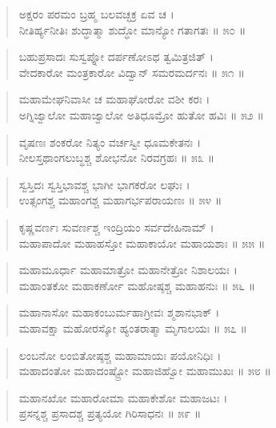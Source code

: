 \begin{verse}
ಅಕ್ಷರಂ ಪರಮಂ ಬ್ರಹ್ಮ ಬಲವಚ್ಛಕ್ರ ಏವ ಚ ।\\ನೀತಿರ್ಹ್ಯನೀತಿಃ ಶುದ್ಧಾತ್ಮಾ ಶುದ್ಧೋ ಮಾನ್ಯೋ ಗತಾಗತಃ \num{॥ ೫೦ ॥}
\end{verse}

\begin{verse}
ಬಹುಪ್ರಸಾದಃ ಸುಸ್ವಪ್ನೋ ದರ್ಪಣೋಽಥ ತ್ವಮಿತ್ರಜಿತ್ ।\\ವೇದಕಾರೋ ಮಂತ್ರಕಾರೋ ವಿದ್ವಾನ್ ಸಮರಮರ್ದನಃ \num{॥ ೫೧ ॥}
\end{verse}

\begin{verse}
ಮಹಾಮೇಘನಿವಾಸೀ ಚ ಮಹಾಘೋರೋ ವಶೀ ಕರಃ ।\\ಅಗ್ನಿಜ್ವಾಲೋ ಮಹಾಜ್ವಾಲೋ ಅತಿಧೂಮ್ರೋ ಹುತೋ ಹವಿಃ \num{॥ ೫೨ ॥}
\end{verse}

\begin{verse}
ವೃಷಣಃ ಶಂಕರೋ ನಿತ್ಯಂ ವರ್ಚಸ್ವೀ ಧೂಮಕೇತನಃ ।\\ನೀಲಸ್ತಥಾಂಗಲುಬ್ಧಶ್ಚ ಶೋಭನೋ ನಿರವಗ್ರಹಃ \num{॥ ೫೩ ॥}
\end{verse}

\begin{verse}
ಸ್ವಸ್ತಿದಃ ಸ್ವಸ್ತಿಭಾವಶ್ಚ ಭಾಗೀ ಭಾಗಕರೋ ಲಘುಃ ।\\ಉತ್ಸಂಗಶ್ಚ ಮಹಾಂಗಶ್ಚ ಮಹಾಗರ್ಭಪರಾಯಣಃ \num{॥ ೫೪ ॥}
\end{verse}

\begin{verse}
ಕೃಷ್ಣವರ್ಣಃ ಸುವರ್ಣಶ್ಚ ಇಂದ್ರಿಯಂ ಸರ್ವದೇಹಿನಾಮ್ ।\\ಮಹಾಪಾದೋ ಮಹಾಹಸ್ತೋ ಮಹಾಕಾಯೋ ಮಹಾಯಶಾಃ \num{॥ ೫೫ ॥}
\end{verse}

\begin{verse}
ಮಹಾಮೂರ್ಧಾ ಮಹಾಮಾತ್ರೋ ಮಹಾನೇತ್ರೋ ನಿಶಾಲಯಃ ।\\ಮಹಾಂತಕೋ ಮಹಾಕರ್ಣೋ ಮಹೋಷ್ಠಶ್ಚ ಮಹಾಹನುಃ \num{॥ ೫೬ ॥}
\end{verse}

\begin{verse}
ಮಹಾನಾಸೋ ಮಹಾಕಂಬುರ್ಮಹಾಗ್ರೀವಃ ಶ್ಮಶಾನಭಾಕ್ ।\\ಮಹಾವಕ್ಷಾ ಮಹೋರಸ್ಕೋ ಹ್ಯಂತರಾತ್ಮಾ ಮೃಗಾಲಯಃ \num{॥ ೫೭ ॥}
\end{verse}

\begin{verse}
ಲಂಬನೋ ಲಂಬಿತೋಷ್ಠಶ್ಚ ಮಹಾಮಾಯಃ ಪಯೋನಿಧಿಃ ।\\ಮಹಾದಂತೋ ಮಹಾದಂಷ್ಟ್ರೋ ಮಹಾಜಿಹ್ವೋ ಮಹಾಮುಖಃ \num{॥ ೫೮ ॥}
\end{verse}

\begin{verse}
ಮಹಾನಖೋ ಮಹಾರೋಮಾ ಮಹಾಕೇಶೋ ಮಹಾಜಟಃ ।\\ಪ್ರಸನ್ನಶ್ಚ ಪ್ರಸಾದಶ್ಚ ಪ್ರತ್ಯಯೋ ಗಿರಿಸಾಧನಃ \num{॥ ೫೯ ॥}
\end{verse}

